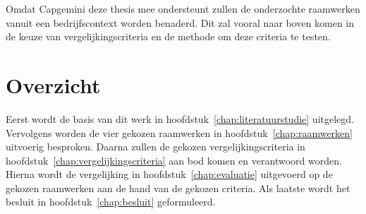 Omdat Capgemini deze thesis mee ondersteunt zullen de onderzochte raamwerken vanuit een bedrijfscontext worden benaderd.
Dit zal vooral naar boven komen in de keuze van vergelijkingscriteria en de methode om deze criteria te testen.

\section{Overzicht}
Eerst wordt de basis van dit werk in hoofdstuk~\ref{chap:literatuurstudie} uitgelegd.
Vervolgens worden de vier gekozen raamwerken in hoofdstuk~\ref{chap:raamwerken} uitvoerig besproken.
Daarna zullen de gekozen vergelijkingscriteria in hoofdstuk~\ref{chap:vergelijkingscriteria} aan bod komen en verantwoord worden.
Hierna wordt de vergelijking in hoofdstuk~\ref{chap:evaluatie} uitgevoerd op de gekozen raamwerken aan de hand van de gekozen criteria.
Als laatste wordt het besluit in hoofdstuk~\ref{chap:besluit} geformuleerd.

